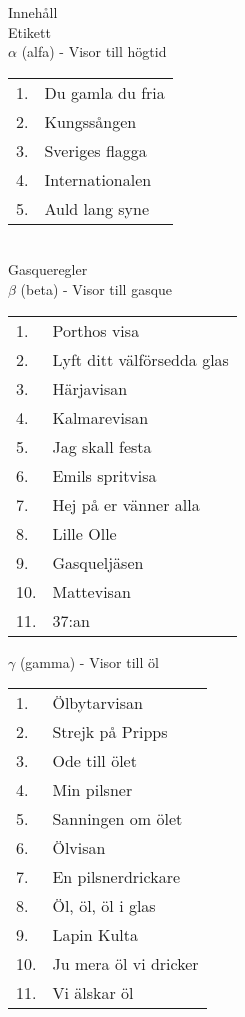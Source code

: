 \documentclass[a6paper,10pt]{article}
\begin{document}
\noindent
\huge{Innehåll}
\vspace{5pt}\\
\Large Etikett 
\vspace{5pt}\\
\Large $\alpha$ (alfa) - Visor till högtid
\vspace{-10pt}
\begin{table}[!ht]
\begin{tabularx}{0.55\textwidth}{l X}
1.&Du gamla du fria\\
2.&Kungssången\\
3.&Sveriges flagga\\
4.&Internationalen\\
5.&Auld lang syne
\end{tabularx}
\end{table}
\vspace{-5pt}\\
\Large Gasqueregler
\vspace{5pt}\\
\Large $\beta$ (beta) - Visor till gasque
\vspace{-10pt}
\begin{table}[!ht]
\begin{tabularx}{0.65\textwidth}{l X}
1.&Porthos visa\\
2.&Lyft ditt välförsedda glas\\
3.&Härjavisan\\
4.&Kalmarevisan\\
5.&Jag skall festa \\
6.&Emils spritvisa\\
7.&Hej på er vänner alla\\
8.&Lille Olle\\
9.&Gasqueljäsen\\
10.&Mattevisan\\
11.&37:an
\end{tabularx}
\end{table}

\newpage
\setlength{\oddsidemargin}{-0.47in}
\noindent
\Large $\gamma$ (gamma) - Visor till öl
\vspace{-10pt}
\begin{table}[!ht]
\begin{tabularx}{0.65\textwidth}{l X}
1.&Ölbytarvisan\\
2.&Strejk på Pripps\\
3.&Ode till ölet\\
4.&Min pilsner\\
5.&Sanningen om ölet \\
6.&Ölvisan\\
7.&En pilsnerdrickare\\
8.&Öl, öl, öl i glas\\
9.&Lapin Kulta\\
10.&Ju mera öl vi dricker\\
11.&Vi älskar öl
\end{tabularx}
\end{table}
\end{document}
